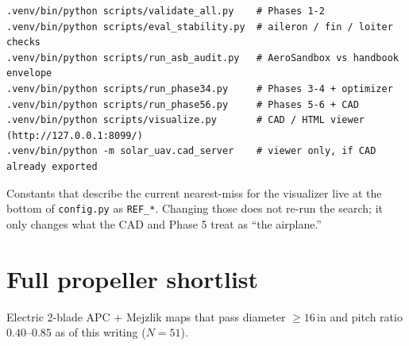 \documentclass[11pt,letterpaper]{article}
\newcommand{\code}[1]{\texttt{#1}}
\begin{document}
\begin{verbatim}
.venv/bin/python scripts/validate_all.py    # Phases 1-2
.venv/bin/python scripts/eval_stability.py  # aileron / fin / loiter checks
.venv/bin/python scripts/run_asb_audit.py   # AeroSandbox vs handbook envelope
.venv/bin/python scripts/run_phase34.py     # Phases 3-4 + optimizer
.venv/bin/python scripts/run_phase56.py     # Phases 5-6 + CAD
.venv/bin/python scripts/visualize.py       # CAD / HTML viewer (http://127.0.0.1:8099/)
.venv/bin/python -m solar_uav.cad_server    # viewer only, if CAD already exported
\end{verbatim}

Constants that describe the current nearest-miss for the visualizer live at the bottom of \code{config.py} as \code{REF\_*}. Changing those does not re-run the search; it only changes what the CAD and Phase 5 treat as ``the airplane.''

\appendix
\section{Full propeller shortlist}
\label{app:props}

Electric 2-blade APC + Mejzlik maps that pass diameter $\ge 16\,\mathrm{in}$ and pitch ratio $0.40$--$0.85$ as of this writing ($N=51$).
\end{document}
